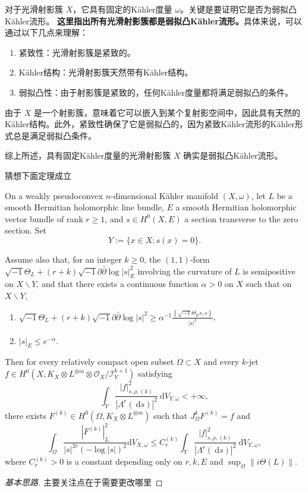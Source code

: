 \documentclass[lang=cn,12pt,fontset=none,a4paper]{beautybook}
\begin{document}
对于光滑射影簇 \( X \)，它具有固定的Kähler度量 \(\omega\)。关键是要证明它是否为弱拟凸Kähler流形。
\textbf{这里指出所有光滑射影簇都是弱拟凸Kähler流形。}具体来说，可以通过以下几点来理解：
\begin{enumerate}
  \item 紧致性：光滑射影簇是紧致的。
  \item Kähler结构：光滑射影簇天然带有Kähler结构。
  \item 弱拟凸性：由于射影簇是紧致的，任何Kähler度量都将满足弱拟凸的条件。
\end{enumerate}


由于 \( X \) 是一个射影簇，意味着它可以嵌入到某个复射影空间中，因此具有天然的Kähler结构。此外，紧致性确保了它是弱拟凸的，因为紧致Kähler流形的Kähler形式总是满足弱拟凸条件。

综上所述，具有固定Kähler度量的光滑射影簇 \( X \) 确实是弱拟凸Kähler流形。

猜想下面定理成立
\begin{theorem}
   On a weakly pseudoconvex $n$-dimensional Kähler manifold $(X, \omega)$, let $L$ be a smooth Hermitian holomorphic line bundle, $E$ a smooth Hermitian holomorphic vector bundle of rank $r \geq 1$, and $s \in H^0(X, E)$ a section transverse to the zero section. Set
$$
Y:=\{x \in X: s(x)=0\} .
$$

Assume also that, for an integer $k \geq 0$, the $(1,1)$-form $\sqrt{-1} \Theta_L+(r+k) \sqrt{-1} \partial \bar{\partial} \log |s|_E^2$ involving the curvature of $L$ is semipositive on $X \backslash Y$, and that there exists a continuous function $\alpha>0$ on $X$ such that on $X \backslash Y$,
\begin{enumerate}[label=(\roman*)]
  \item $\sqrt{-1} \Theta_L+(r+k) \sqrt{-1} \partial \bar{\partial} \log |s|^2 \geq \alpha^{-1} \frac{\left\{\sqrt{-1} \Theta_E s, s\right\}}{|s|^2}$,
  \item $|s|_E \leq e^{-\alpha}$.
\end{enumerate}
Then for every relatively compact open subset $\Omega \subset X$ and every $k$-jet $f \in H^0\left(X, K_X \otimes L^{\otimes m}\otimes \mathscr{O}_X / \mathscr{I}_Y^{k+1}\right)$ satisfying
$$
\int_Y \frac{|f|_{s, \rho,(k)}^2}{\left|\Lambda^r(\mathrm{~d} s)\right|^2} \mathrm{~d} V_{Y, \omega}<+\infty,
$$
there exists $F^{(k)} \in H^0\left(\Omega, K_X \otimes L^{\otimes m}\right)$ such that $J_{\Omega}^k F^{(k)}=f$ and
$$
\int_{\Omega} \frac{\left|F^{(k)}\right|_L^2}{|s|^{2 r} \left(-\log |s|\right)^2} \mathrm{d} V_{X, \omega} \leq C_{r}^{(k)} \int_Y \frac{|f|_{s, \rho,(k)}^2}{\left|\Lambda^r(\mathrm{~d} s)\right|^2} \mathrm{~d} V_{Y, \omega},
$$
where $C_{r}^{(k)}>0$ is a constant depending only on $r, k, E$ and $\sup _{\Omega}\|i \Theta(L)\|$.
\end{theorem}
\begin{proof}[基本思路]
  主要关注点在于需要更改哪里
\end{proof}
\end{document}
